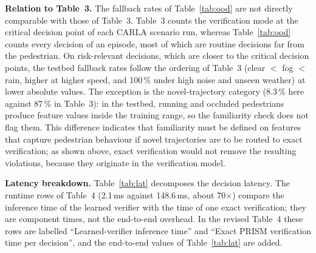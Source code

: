\documentclass[11pt]{article}
\begin{document}
\textbf{Relation to Table~3.} The fallback rates of Table~\ref{tab:ood} are not directly comparable with those of Table~3. Table~3 counts the
verification mode at the critical decision point of each CARLA scenario run, whereas Table~\ref{tab:ood} counts every decision of an episode,
most of which are routine decisions far from the pedestrian. On risk-relevant decisions, which are closer to the critical decision points, the
testbed fallback rates follow the ordering of Table~3 (clear $<$ fog $<$ rain, higher at higher speed, and 100\,\% under high noise and unseen
weather) at lower absolute values. The exception is the novel-trajectory category (8.3\,\% here against 87\,\% in Table~3):
in the testbed, running and occluded pedestrians produce feature values inside the training range, so the familiarity check does not flag them.
This difference indicates that familiarity must be defined on features that capture pedestrian behaviour if novel trajectories are to be routed to
exact verification; as shown above, exact verification would not remove the resulting violations, because they originate in the verification model.

\textbf{Latency breakdown.} Table~\ref{tab:lat} decomposes the decision latency. The runtime rows of Table~4 (2.1\,ms against 148.6\,ms, about
70$\times$) compare the inference time of the learned verifier with the time of one exact verification; they are component times, not the
end-to-end overhead. In the revised Table~4 these rows are labelled ``Learned-verifier inference time'' and ``Exact PRISM verification time per
decision'', and the end-to-end values of Table~\ref{tab:lat} are added.
\end{document}
